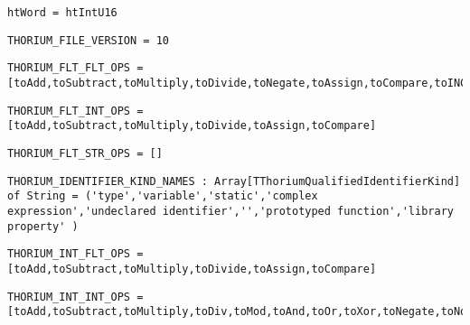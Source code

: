 \begin{verbatim}
htWord = htIntU16
\end{verbatim}
\label{thoriumcore:thorium:htword}



\begin{verbatim}
THORIUM_FILE_VERSION = 10
\end{verbatim}
\label{thoriumcore:thorium:thoriumfileversion}



\begin{verbatim}
THORIUM_FLT_FLT_OPS = [toAdd,toSubtract,toMultiply,toDivide,toNegate,toAssign,toCompare,toINC_DEC]
\end{verbatim}
\label{thoriumcore:thorium:thoriumfltfltops}



\begin{verbatim}
THORIUM_FLT_INT_OPS = [toAdd,toSubtract,toMultiply,toDivide,toAssign,toCompare]
\end{verbatim}
\label{thoriumcore:thorium:thoriumfltintops}



\begin{verbatim}
THORIUM_FLT_STR_OPS = []
\end{verbatim}
\label{thoriumcore:thorium:thoriumfltstrops}



\begin{verbatim}
THORIUM_IDENTIFIER_KIND_NAMES : Array[TThoriumQualifiedIdentifierKind] of String = ('type','variable','static','complex expression','undeclared identifier','','prototyped function','library property' )
\end{verbatim}
\label{thoriumcore:thorium:thoriumidentifierkindnames}



\begin{verbatim}
THORIUM_INT_FLT_OPS = [toAdd,toSubtract,toMultiply,toDivide,toAssign,toCompare]
\end{verbatim}
\label{thoriumcore:thorium:thoriumintfltops}



\begin{verbatim}
THORIUM_INT_INT_OPS = [toAdd,toSubtract,toMultiply,toDiv,toMod,toAnd,toOr,toXor,toNegate,toNot,toAssign,toCompare,toDivide,toINC_DEC,toBoolNot]
\end{verbatim}
\label{thoriumcore:thorium:thoriumintintops}




